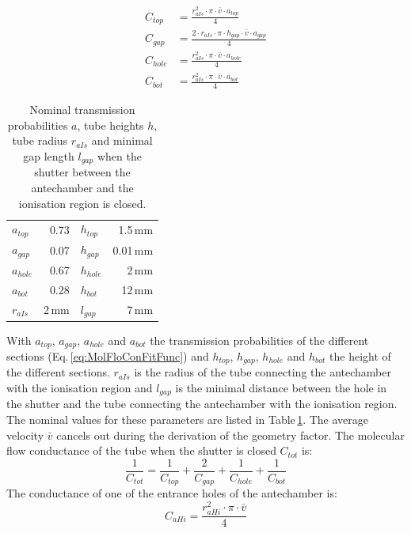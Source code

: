 	\begin{align}
		C_{top}  &= \frac{r_{aIs}^2\cdot\pi\cdot\bar{v}\cdot a_{top}}{4}\\
		C_{gap}  &= \frac{2\cdot r_{aIs}\cdot \pi \cdot h_{gap}\cdot\bar{v}\cdot a_{gap}}{4}\\
		C_{hole} &= \frac{r_{aIs}^2\cdot\pi\cdot\bar{v}\cdot a_{hole}}{4}\\
		C_{bot}  &= \frac{r_{aIs}^2\cdot\pi\cdot\bar{v}\cdot a_{bot}}{4}
	\end{align}
	\begin{table}[H]
		\begin{center}
			\begin{tabular}{|l r| l r| }
				\hline
				$a_{top}$	& 0.73 	& $h_{top}$		& 1.5\,mm	\\
				$a_{gap}$	& 0.07 	& $h_{gap}$		& 0.01\,mm \\
				$a_{hole}$ 	& 0.67 	& $h_{hole}$ 	& 2\,mm\\
				$a_{bot}$ 	& 0.28 	& $h_{bot}$ 	& 12\,mm\\
				$r_{aIs}$ 	& 2\,mm & $l_{gap}$ 	& 7\,mm\\
				\hline
			\end{tabular}
		\end{center}
		\caption{Nominal transmission probabilities $a$, tube heights $h$, tube radius $r_{aIs}$ and minimal gap length $l_{gap}$ when the shutter between the antechamber and the ionisation region is closed.}
		\label{tab:thMolFloConMotClosPara}
	\end{table}
	With $a_{top}$, $a_{gap}$, $a_{hole}$ and $a_{bot}$ the transmission probabilities of the different sections (Eq.\,\eqref{eq:MolFloConFitFunc}) and $h_{top}$, $h_{gap}$, $h_{hole}$ and $h_{bot}$ the height of the different sections. $r_{aIs}$ is the radius of the tube connecting the antechamber with the ionisation region and $l_{gap}$ is the minimal distance between the hole in the shutter and the tube connecting the antechamber with the ionisation region. The nominal values for these parameters are listed in Table\,\ref{tab:thMolFloConMotClosPara}. The average velocity $\bar{v}$ cancels out during the derivation of the geometry factor. The molecular flow conductance of the tube when the shutter is closed $C_{tot}$ is:
	\begin{equation}
		\frac{1}{C_{tot}} = \frac{1}{C_{top}} + \frac{2}{C_{gap}} + \frac{1}{C_{hole}} + \frac{1}{C_{bot}}
	\end{equation}
	The conductance of one of the entrance holes of the antechamber is:
	\begin{equation}
		C_{aHi} = \frac{r_{aHi}^2\cdot\pi\cdot\bar{v}}{4}
	\end{equation}
